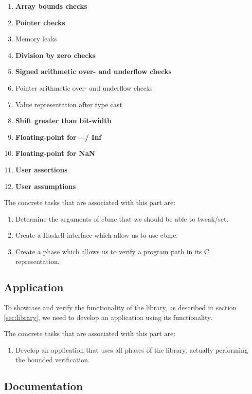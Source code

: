 \documentclass[a4paper]{article}
\begin{document}
\begin{enumerate}
    \item \textbf{Array bounds checks}
    \item \textbf{Pointer checks}
    \item Memory leaks
    \item \textbf{Division by zero checks}
    \item \textbf{Signed arithmetic over- and underflow checks}
    \item Pointer arithmetic over- and underflow checks
    \item Value representation after type cast
    \item \textbf{Shift greater than bit-width}
    \item \textbf{Floating-point for +/ Inf}
    \item \textbf{Floating-point for NaN}
    \item \textbf{User assertions}
    \item \textbf{User assumptions}
\end{enumerate}

The concrete tasks that are associated with this part are:
\begin{enumerate}
    \item Determine the arguments of cbmc that we should be able to tweak/set.
    \item Create a Haskell interface which allow us to use cbmc.
    \item Create a phase which allows us to verify a program path in its C 
    representation.
\end{enumerate}

\subsection{Application}
To showcase and verify the functionality of the library, as described in section
\ref{sec:library}, we need to develop an application using its functionality. 

The concrete tasks that are associated with this part are:
\begin{enumerate}
    \item Develop an application that uses all phases of the library, actually 
    performing the bounded verification.
\end{enumerate}

\subsection{Documentation}
\end{document}
